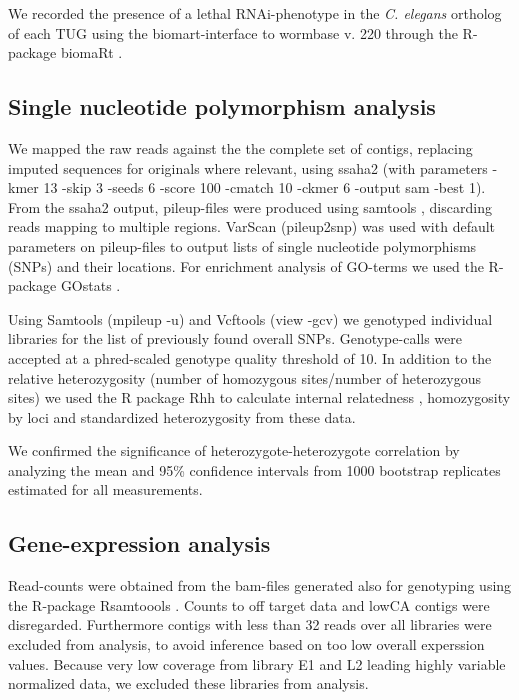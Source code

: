 \documentclass[10pt]{bmc_article}
\newenvironment{bmcformat}{\begin{raggedright}\baselineskip20pt\sloppy\setboolean{publ}{false}}{\end{raggedright}\baselineskip20pt\sloppy}
\begin{document}
\begin{bmcformat}
We recorded the presence of a lethal RNAi-phenotype in the
\textit{C. elegans} ortholog of each TUG using the biomart-interface
\cite{pmid22083790} to wormbase v. 220 through the R-package biomaRt
\cite{pmid19617889}.

\subsection*{Single nucleotide polymorphism analysis}

We mapped the raw reads against the the complete set of contigs,
replacing imputed sequences for originals where relevant, using ssaha2
\cite{pmid11591649} (with parameters -kmer 13 -skip 3 -seeds 6 -score
100 -cmatch 10 -ckmer 6 -output sam -best 1). From the ssaha2 output,
pileup-files were produced using samtools
\cite{journals/bioinformatics/LiHWFRHMAD09}, discarding reads mapping
to multiple regions. VarScan \cite{pmid19542151} (pileup2snp) was used
with default parameters on pileup-files to output lists of single
nucleotide polymorphisms (SNPs) and their locations. For enrichment
analysis of GO-terms we used the R-package GOstats
\cite{pmid17098774}.

Using Samtools \cite{journals/bioinformatics/LiHWFRHMAD09} (mpileup
-u) and Vcftools \cite{pmid21653522} (view -gcv) we genotyped
individual libraries for the list of previously found overall
SNPs. Genotype-calls were accepted at a phred-scaled genotype quality
threshold of 10. In addition to the relative heterozygosity (number of
homozygous sites/number of heterozygous sites) we used the R package
Rhh \cite{pmid21565077} to calculate internal relatedness
\cite{pmid11571049}, homozygosity by loci \cite{pmid17107491} and
standardized heterozygosity \cite{coltman81j} from these data.

We confirmed the significance of heterozygote-heterozygote correlation
by analyzing the mean and 95\% confidence intervals from 1000
bootstrap replicates estimated for all measurements.

\subsection*{Gene-expression analysis}

Read-counts were obtained from the bam-files generated also for
genotyping using the R-package Rsamtoools \cite{rsamtools}. Counts to
off target data and lowCA contigs were disregarded. Furthermore
contigs with less than 32 reads over all libraries were excluded from
analysis, to avoid inference based on too low overall experssion
values. Because very low coverage from library E1 and L2 leading
highly variable normalized data, we excluded these libraries from
analysis.


\end{bmcformat}
\end{document}
